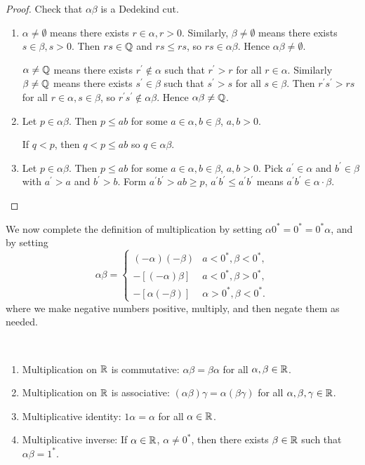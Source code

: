 \begin{proof}
Check that $\alpha\beta$ is a Dedekind cut.
\begin{enumerate}[label=(\roman*)]
\item $\alpha\neq\emptyset$ means there exists $r\in\alpha,r>0$. Similarly, $\beta\neq\emptyset$ means there exists $s\in\beta,s>0$. Then $rs\in\mathbb Q$ and $rs\le rs$, so $rs\in\alpha\beta$. Hence $\alpha\beta\neq\emptyset$.

$\alpha\neq\mathbb Q$ means there exists $r^\prime\notin\alpha$ such that $r^\prime>r$ for all $r\in\alpha$. Similarly $\beta\neq\mathbb Q$ means there exists $s^\prime\in\beta$ such that $s^\prime>s$ for all $s\in\beta$. Then $r^\prime s^\prime>rs$ for all $r\in\alpha,s\in\beta$, so $r^\prime s^\prime\notin\alpha\beta$. Hence $\alpha\beta\neq\mathbb Q$.

\item Let $p\in\alpha\beta$. Then $p\le ab$ for some $a\in\alpha,b\in\beta$, $a,b>0$.

If $q<p$, then $q<p\le ab$ so $q\in\alpha\beta$.

\item Let $p\in\alpha\beta$. Then $p\le ab$ for some $a\in\alpha,b\in\beta$, $a,b>0$. Pick $a^\prime\in\alpha$ and $b^\prime\in\beta$ with $a^\prime>a$ and $b^\prime>b$. Form $a^\prime b^\prime>ab\ge p$, $a^\prime b^\prime\le a^\prime b^\prime$ means $a^\prime b^\prime\in\alpha\cdot\beta$.
\end{enumerate}
\end{proof}

We now complete the definition of multiplication by setting $\alpha0^*=0^*=0^*\alpha$, and by setting
\[\alpha\beta=\begin{cases}
(-\alpha)(-\beta)&a<0^*,\beta<0^*,\\
-[(-\alpha)\beta]&a<0^*,\beta>0^*,\\
-[\alpha(-\beta)]&\alpha>0^*,\beta<0^*.
\end{cases}\]
where we make negative numbers positive, multiply, and then negate them as needed.

\begin{lemma} \
\begin{enumerate}[label=(\roman*)]
\item Multiplication on $\mathbb R$ is commutative: $\alpha\beta=\beta\alpha$ for all $\alpha,\beta\in\mathbb R$.
\item Multiplication on $\mathbb R$ is associative: $(\alpha\beta)\gamma=\alpha(\beta\gamma)$ for all $\alpha,\beta,\gamma\in\mathbb R$.
\item Multiplicative identity: $1\alpha=\alpha$ for all $\alpha\in\mathbb R$.
\item Multiplicative inverse: If $\alpha\in\mathbb R$, $\alpha\neq0^*$, then there exists $\beta\in\mathbb R$ such that $\alpha\beta=1^*$.
\end{enumerate}
\end{lemma}

